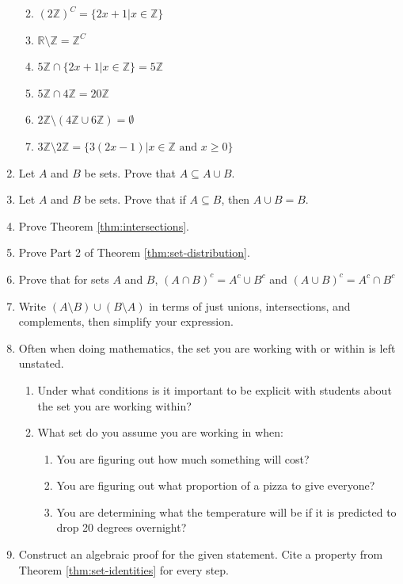 \documentclass[
]{book}
\providecommand{\tightlist}{%
  \setlength{\itemsep}{0pt}\setlength{\parskip}{0pt}}
\theoremstyle{definition}
\theoremstyle{definition}
\theoremstyle{definition}
\theoremstyle{definition}
\theoremstyle{remark}
\begin{document}
\begin{enumerate}
  \begin{enumerate}
  \def\labelenumii{\alph{enumii}.}
  \tightlist
  \item
    \((2\mathbb{Z})^C = \{2x+1 \vert x \in \mathbb{Z}\}\)
  \item
    \(\mathbb{R}\setminus \mathbb{Z}=\mathbb{Z}^C\)
  \item
    \(5\mathbb{Z} \cap \{2x+1 \vert x \in \mathbb{Z}\} = 5\mathbb{Z}\)
  \item
    \(5\mathbb{Z} \cap 4\mathbb{Z} = 20\mathbb{Z}\)
  \item
    \(2\mathbb{Z}\setminus (4\mathbb{Z} \cup 6\mathbb{Z})= \emptyset\)
  \item
    \(3\mathbb{Z}\setminus 2\mathbb{Z}=\{3(2x-1) \vert x\in \mathbb{Z} \textrm{ and } x\geq 0\}\)
  \end{enumerate}
\item
  Let \(A\) and \(B\) be sets. Prove that \(A\subseteq A\cup B\).
\item
  Let \(A\) and \(B\) be sets. Prove that if \(A\subseteq B\), then \(A\cup B=B\).
\item
  Prove Theorem \ref{thm:intersections}.
\item
  Prove Part 2 of Theorem \ref{thm:set-distribution}.
\item
  Prove that for sets \(A\) and \(B\), \((A\cap B)^c = A^c \cup B^c\) and \((A\cup B)^c=A^c\cap B^c\)
\item
  Write \((A\setminus B)\cup (B\setminus A)\) in terms of just unions, intersections, and complements, then simplify your expression.
\item
  Often when doing mathematics, the set you are working with or within is left unstated.

  \begin{enumerate}
  \def\labelenumii{\alph{enumii}.}
  \tightlist
  \item
    Under what conditions is it important to be explicit with students about the set you are working within?
  \item
    What set do you assume you are working in when:

    \begin{enumerate}
    \def\labelenumiii{\arabic{enumiii}.}
    \tightlist
    \item
      You are figuring out how much something will cost?
    \item
      You are figuring out what proportion of a pizza to give everyone?
    \item
      You are determining what the temperature will be if it is predicted to drop 20 degrees overnight?
    \end{enumerate}
  \end{enumerate}
\item
  Construct an algebraic proof for the given statement. Cite a property from Theorem \ref{thm:set-identities} for every step.
\end{enumerate}
\end{document}
